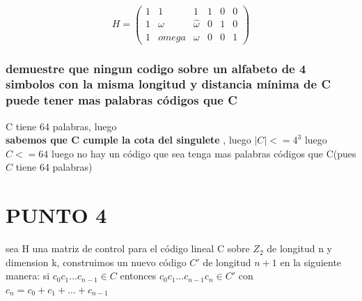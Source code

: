 \documentclass[10pt,a4paper]{article} %
\begin{document}
        \begin{equation}
            H = \begin{pmatrix}
            1 & 1& 1  & 1 & 0 & 0
            \\
            1 & \omega & \hat{\omega }   & 0 & 1 & 0
            \\
            1 & \hat{omega} & \omega   & 0 & 0 & 1
            \end{pmatrix}
        \end{equation}

        \subsubsection{demuestre que ningun codigo sobre un alfabeto de 4
        simbolos con la misma longitud y distancia mínima de C puede tener mas
        palabras códigos que C}
            C tiene 64 palabras, luego
            \\
            \textbf{sabemos que C cumple la cota del singulete} , luego $|C| <= 4 ^{3} $
            luego $C <= 64$ luego no hay un código que sea tenga mas palabras
            códigos que C(pues $C$ tiene 64 palabras)



        \section{PUNTO 4}

            sea H una matriz de control para el código lineal C sobre $Z_2$ de
            longitud n y dimension k, construimos un nuevo código $C'$ de
            longitud $n+1$ en la siguiente manera:
            si $c_0c_1...c_{n-1} \in C$ entonces $c_0c_1 ... c_{n-1}c_n \in C'$
            con $c_n = c_0 + c_1 + ... + c_{n-1}$
\end{document}
